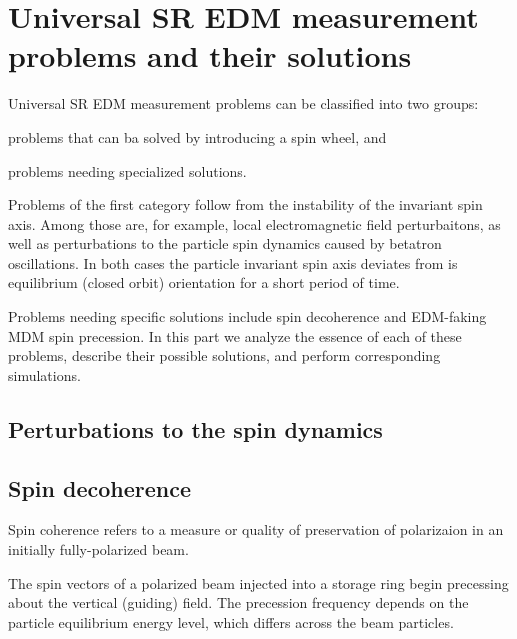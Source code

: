 

\chapter{Universal SR EDM measurement problems and their solutions} \label{chpt3:top-level}
 
Universal SR EDM measurement problems can be classified into two groups:
\begin{enumerate*}[(i)]
	\item problems that can ba solved by introducing a spin wheel, and
	\item problems needing specialized solutions.
\end{enumerate*}

Problems of the first category follow from the instability of the invariant spin axis. Among those are,
for example, local electromagnetic field perturbaitons, as well as perturbations to the particle
spin dynamics caused by betatron oscillations. In both cases the particle invariant spin axis deviates from
is equilibrium (closed orbit) orientation for a short period of time.

Problems needing specific solutions include spin decoherence and EDM-faking MDM spin precession. In this part we
analyze the essence of each of these problems, describe their possible solutions, and perform corresponding
simulations.
  
\section{Perturbations to the spin dynamics}\label{chpt3:smp}


\section{Spin decoherence}\label{chpt3:decoherence}
Spin coherence refers to a measure or quality of preservation of polarizaion
in an initially fully-polarized beam.~\cite[стр.~205]{Eremey:Thesis}

The spin vectors of a polarized beam injected into a storage ring
begin precessing about the vertical (guiding) field. The precession frequency
depends on the particle equilibrium energy level, which differs across the beam particles.

